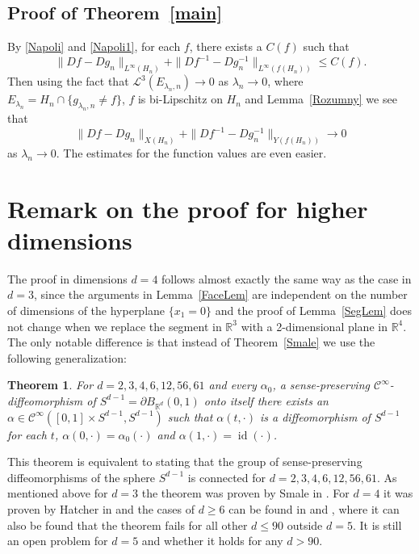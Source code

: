 \documentclass[12pt,a4paper]{amsart}
\theoremstyle{plain}
\newtheorem{thm}{Theorem}[section]
\theoremstyle{definition}
\numberwithin{equation}{section}
\def\er{\mathbb R}
\def\id{\operatorname{id}}
\begin{document}
	
	\subsection{Proof of Theorem~\ref{main}}	
	
	By \eqref{Napoli} and \eqref{Napoli1}, for each $f$, there exists a $C(f)$ such that
	$$
	\|Df-Dg_n\|_{L^{\infty}(H_n)} + \|Df^{-1} - Dg_n^{-1}\|_{L^{\infty}(f(H_n))} \leq C(f).
	$$
	Then using the fact that $\mathcal{L}^3(E_{\lambda_n, n}) \to 0$ as $\lambda_n \to 0$, where $E_{\lambda_n} = H_n\cap \{g_{\lambda_n,n}\neq f\}$, $f$ is bi-Lipschitz on $H_n$ and Lemma~\ref{Rozumny} we see that
	$$
	\|Df-Dg_n\|_{X(H_n)} + \|Df^{-1} - Dg_n^{-1}\|_{Y(f(H_n))} \to 0
	$$
	as $\lambda_n\to 0$. The estimates for the function values are even easier.
	
	\section{Remark on the proof for higher dimensions}
	The proof in dimensions $d=4$ follows almost exactly the same way as the case in $d=3$, since the arguments in Lemma~\ref{FaceLem} are independent on the number of dimensions of the hyperplane $\{x_1 = 0\}$ and the proof of Lemma~\ref{SegLem} does not change when we replace the segment in $\er^3$ with a 2-dimensional plane in $\er^4$. The only notable difference is that instead of Theorem~\ref{Smale} we use the following generalization:
	\begin{thm}\label{Tomasova}
		For $d=2, 3, 4, 6, 12, 56, 61$ and every $\alpha_0$, a sense-preserving $\mathcal{C}^{\infty}$-diffeomorphism of $S^{d-1} = \partial B_{\er^d}(0,1)$ onto itself there exists an $\alpha\in \mathcal{C}^{\infty}([0,1]\times S^{d-1}, S^{d-1})$ such that $\alpha(t,\cdot)$ is a diffeomorphism of $S^{d-1}$ for each $t$, $\alpha(0,\cdot) = \alpha_0(\cdot)$ and $\alpha(1,\cdot) = \id(\cdot)$. 
	\end{thm}	
	This theorem is equivalent to stating that the group of sense-preserving diffeomorphisms of the sphere $S^{d-1}$ is connected for $d=2, 3, 4, 6, 12, 56, 61.$ As mentioned above for $d=3$ the theorem was proven by Smale in \cite[Theorem A]{S}. For $d=4$ it was proven by Hatcher in \cite{H} and the cases of $d \geq 6$ can be found in \cite[Section II]{Hatcher50} and \cite[Table 1 and 2]{StableHomotopyGroups}, where it can also be found that the theorem fails for all other $d \leq 90$ outside $d=5.$ It is still an open problem for $d=5$ and whether it holds for any $d>90.$
	
\end{document}
